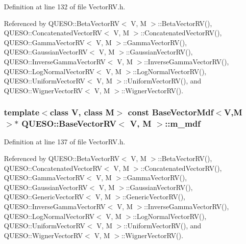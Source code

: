 Definition at line 132 of file Vector\-R\-V.\-h.



Referenced by Q\-U\-E\-S\-O\-::\-Beta\-Vector\-R\-V$<$ V, M $>$\-::\-Beta\-Vector\-R\-V(), Q\-U\-E\-S\-O\-::\-Concatenated\-Vector\-R\-V$<$ V, M $>$\-::\-Concatenated\-Vector\-R\-V(), Q\-U\-E\-S\-O\-::\-Gamma\-Vector\-R\-V$<$ V, M $>$\-::\-Gamma\-Vector\-R\-V(), Q\-U\-E\-S\-O\-::\-Gaussian\-Vector\-R\-V$<$ V, M $>$\-::\-Gaussian\-Vector\-R\-V(), Q\-U\-E\-S\-O\-::\-Inverse\-Gamma\-Vector\-R\-V$<$ V, M $>$\-::\-Inverse\-Gamma\-Vector\-R\-V(), Q\-U\-E\-S\-O\-::\-Log\-Normal\-Vector\-R\-V$<$ V, M $>$\-::\-Log\-Normal\-Vector\-R\-V(), Q\-U\-E\-S\-O\-::\-Uniform\-Vector\-R\-V$<$ V, M $>$\-::\-Uniform\-Vector\-R\-V(), and Q\-U\-E\-S\-O\-::\-Wigner\-Vector\-R\-V$<$ V, M $>$\-::\-Wigner\-Vector\-R\-V().

\hypertarget{class_q_u_e_s_o_1_1_base_vector_r_v_a5a95d0107f66cf9b0ed3ad18a3d738df}{
\subsubsection[{m\-\_\-mdf}]{\setlength{\rightskip}{0pt plus 5cm}template$<$class V, class M$>$ const {\bf Base\-Vector\-Mdf}$<$V,M$>$$\ast$ {\bf Q\-U\-E\-S\-O\-::\-Base\-Vector\-R\-V}$<$ V, M $>$\-::m\-\_\-mdf\hspace{0.3cm}{\ttfamily [protected]}}}\label{class_q_u_e_s_o_1_1_base_vector_r_v_a5a95d0107f66cf9b0ed3ad18a3d738df}


Definition at line 137 of file Vector\-R\-V.\-h.



Referenced by Q\-U\-E\-S\-O\-::\-Beta\-Vector\-R\-V$<$ V, M $>$\-::\-Beta\-Vector\-R\-V(), Q\-U\-E\-S\-O\-::\-Concatenated\-Vector\-R\-V$<$ V, M $>$\-::\-Concatenated\-Vector\-R\-V(), Q\-U\-E\-S\-O\-::\-Gamma\-Vector\-R\-V$<$ V, M $>$\-::\-Gamma\-Vector\-R\-V(), Q\-U\-E\-S\-O\-::\-Gaussian\-Vector\-R\-V$<$ V, M $>$\-::\-Gaussian\-Vector\-R\-V(), Q\-U\-E\-S\-O\-::\-Generic\-Vector\-R\-V$<$ V, M $>$\-::\-Generic\-Vector\-R\-V(), Q\-U\-E\-S\-O\-::\-Inverse\-Gamma\-Vector\-R\-V$<$ V, M $>$\-::\-Inverse\-Gamma\-Vector\-R\-V(), Q\-U\-E\-S\-O\-::\-Log\-Normal\-Vector\-R\-V$<$ V, M $>$\-::\-Log\-Normal\-Vector\-R\-V(), Q\-U\-E\-S\-O\-::\-Uniform\-Vector\-R\-V$<$ V, M $>$\-::\-Uniform\-Vector\-R\-V(), and Q\-U\-E\-S\-O\-::\-Wigner\-Vector\-R\-V$<$ V, M $>$\-::\-Wigner\-Vector\-R\-V().

